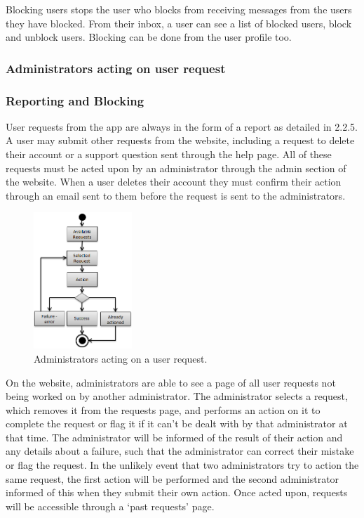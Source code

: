 Blocking users stops the user who blocks from receiving messages from the users they have blocked. From their inbox, a user can see a list of blocked users, block and unblock users. Blocking can be done from the user profile too.

\subsubsection{Administrators acting on user request}
\subsubsection{Reporting and Blocking}

User requests from the app are always in the form of a report as detailed in 2.2.5. A user may submit other requests from the website, including a request to delete their account or a support question sent through the help page. All of these requests must be acted upon by an administrator through the admin section of the website. When a user deletes their account they must confirm their action through an email sent to them before the request is sent to the administrators.

\newpage
\begin{figure}
	\vspace{-20pt}
	\begin{center}
	\includegraphics[width=0.33\textwidth]{images/admins_acting}
	\caption{Administrators acting on a user request.}
	\label{admins_acting}
	\end{center}
	\vspace{-20pt}
\end{figure}

On the website, administrators are able to see a page of all user requests not being worked on by another administrator. The administrator selects a request, which removes it from the requests page, and performs an action on it to complete the request or flag it if it can't be dealt with by that administrator at that time. The administrator will be informed of the result of their action and any details about a failure, such that the administrator can correct their mistake or flag the request. In the unlikely event that two administrators try to action the same request, the first action will be performed and the second administrator informed of this when they submit their own action. Once acted upon, requests will be accessible through a `past requests' page.

